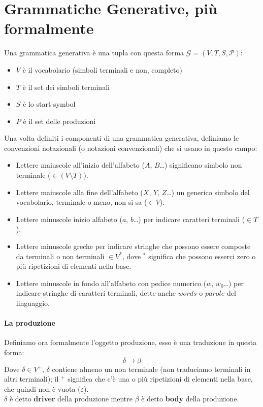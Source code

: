 \documentclass[class=book, crop=false, oneside, 12pt]{standalone}
\begin{document}
\section{Grammatiche Generative, più formalmente}
Una grammatica generativa è una tupla con questa forma \(\mathcal{G}=(V, T, S, \mathcal{P})\):
\begin{itemize}
    \item \(V\) è il vocabolario (simboli terminali e non, completo)
    \item \(T\) è il set dei simboli terminali
    \item \(S\) è lo start symbol
    \item \(P\) è il set delle produzioni
\end{itemize}
Una volta definiti i componenti di una grammatica generativa, definiamo le convenzioni notazionali (o notazioni convenzionali) che si usano in questo campo:
\begin{itemize}
    \item Lettere maiuscole all’inizio dell’alfabeto (\(A\), \(B\)…) significano simbolo non terminale (\(\in (V \setminus T)\)).
    \item Lettere maiuscole alla fine dell’alfabeto (\(X\), \(Y\), \(Z\)…) un generico simbolo del vocabolario, terminale o meno, non si sa (\(\in V\)).
    \item Lettere minuscole inizio alfabeto (\(a\), \(b\)…) per indicare caratteri terminali (\(\in T\)).
    \item Lettere minuscole greche per indicare stringhe che possono essere composte da terminali o non terminali \(\in V^*\), dove \(^*\) significa che possono esserci zero o più ripetizioni di elementi nella base.
    \item Lettere minuscole in fondo all’alfabeto con pedice numerico (\(w\), \(w_0\)…) per indicare stringhe di caratteri terminali, dette anche \(words\) o \(parole\) del linguaggio. 
\end{itemize}

\paragraph{La produzione}
Definiamo ora formalmente l'oggetto produzione, esso è una traduzione in questa forma:
\begin{equation}
    \delta \to \beta
\end{equation}
Dove \(\delta \in V^+\), \(\delta\) contiene almeno un non terminale (non traduciamo terminali in altri terminali); il \(^+\) significa che c’è una o più ripetizioni di elementi nella base, che quindi non è vuota (\(\varepsilon\)).\\
\(\delta\) è detto \textbf{driver} della produzione mentre \(\beta\) è detto \textbf{body} della produzione.
\end{document}
